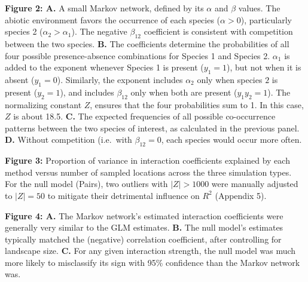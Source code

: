 \documentclass[12pt,]{article}
\begin{document}
\begin{spacing}{1.9}
\begin{flushleft}
\textbf{Figure 2: A.} A small Markov network, defined by its \(\alpha\)
and \(\beta\) values. The abiotic environment favors the occurrence of
each species (\(\alpha >0\)), particularly species 2
(\(\alpha_2 > \alpha_1\)). The negative \(\beta_{12}\) coefficient is
consistent with competition between the two species. \textbf{B.} The
coefficients determine the probabilities of all four possible
presence-absence combinations for Species 1 and Species 2. \(\alpha_1\)
is added to the exponent whenever Species 1 is present (\(y_1 = 1\)),
but not when it is absent (\(y_1 = 0\)). Similarly, the exponent
includes \(\alpha_2\) only when species \(2\) is present (\(y_2 = 1\)),
and includes \(\beta_{12}\) only when both are present (\(y_1y_2 = 1\)).
The normalizing constant \(Z\), ensures that the four probabilities sum
to 1. In this case, \(Z\) is about 18.5. \textbf{C.} The expected
frequencies of all possible co-occurrence patterns between the two
species of interest, as calculated in the previous panel. \textbf{D.}
Without competition (i.e.~with \(\beta_{12}=0\), each species would
occur more often.

\textbf{Figure 3:} Proportion of variance in interaction coefficients
explained by each method versus number of sampled locations across the
three simulation types. For the null model (Pairs), two outliers with
\(|Z|>1000\) were manually adjusted to \(|Z|=50\) to mitigate their
detrimental influence on \(R^2\) (Appendix 5).

\textbf{Figure 4: A.} The Markov network's estimated interaction
coefficients were generally very similar to the GLM estimates.
\textbf{B.} The null model's estimates typically matched the (negative)
correlation coefficient, after controlling for landscape size.
\textbf{C.} For any given interaction strength, the null model was much
more likely to misclassify its sign with 95\% confidence than the Markov
network was.

\end{flushleft}
\end{spacing}
\end{document}
